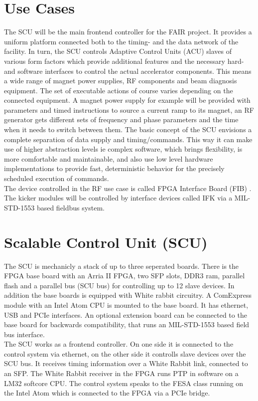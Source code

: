 \documentclass{JAC2003}
\begin{document}
\section{Use Cases}
The SCU will be the main frontend controller for the FAIR project.
It provides a uniform platform connected both to the timing- and the data network of the facility. 
In turn, the SCU controls Adaptive Control Units (ACU) slaves of various form factors which provide additional
features and the necessary hard- and software interfaces to control the actual accelerator components.
This means a wide range of magnet power supplies, RF components and beam diagnosis equipment.
The set of executable actions of course varies depending on the connected equipment.
A magnet power supply for example will be provided with parameters and timed instructions to source
a current ramp to its magnet, an RF generator gets different sets of frequency and phase parameters and the time when it needs to switch between them. 
The basic concept of the SCU envisions a complete separation of data supply and timing/commands.
This way it can make use of higher abstraction levels ie complex software, which brings flexibility, is more comfortable and maintainable, and also use low level hardware implementations to provide fast, deterministic behavior for the precisely scheduled execution of commands.\\
The device controlled in the RF use case is called FPGA Interface Board (FIB) \cite{fibref}.\\
The kicker modules will be controlled by interface devices called IFK via a MIL-STD-1553
based fieldbus system.


\section{Scalable Control Unit (SCU)}
The SCU is mechanicly a stack of up to three seperated boards. There is the FPGA base board
with an Arria II FPGA, two SFP slots, DDR3 ram, parallel flash and a parallel bus (SCU bus) for
controlling up to 12 slave devices. In addition the base boards is equipped with White rabbit circuitry.
A ComExpress module with an Intel Atom CPU is mounted to
the base board. It has ethernet, USB and PCIe interfaces. An optional extension board can
be connected to the base board for backwards compatibility, that runs an MIL-STD-1553 based
field bus interface.\\
The SCU works as a frontend controller. On one side it is connected to the control system via ethernet,
on the other side it controlls slave devices over the SCU bus. It receives timing information over
a White Rabbit link, connected to an SFP. The White Rabbit receiver in the FPGA runs PTP in software
on a LM32 softcore CPU. The control system speaks to the FESA class running
on the Intel Atom which is connected to the FPGA via a PCIe bridge.
 
\end{document}
